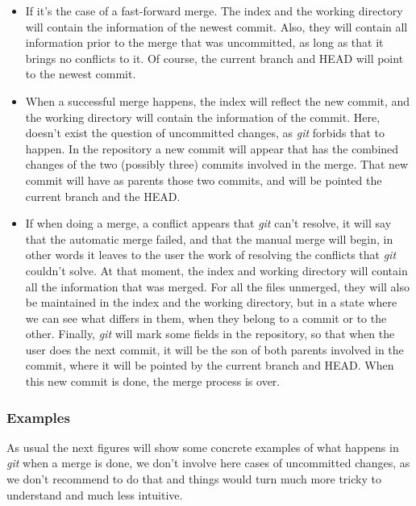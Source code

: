 \begin{itemize}
\item If it's the case of a fast-forward merge. The index and the working directory
will contain the information of the newest commit. Also, they will contain all 
information prior to the merge that was uncommitted, as long as that it brings
no conflicts to it. Of course, the current branch and HEAD will point to the
newest commit.

\item When a successful merge happens, the index will reflect the new commit,
and the working directory will contain the information of the commit. Here,
doesn't exist the question of uncommitted changes, as \emph{git} forbids that
to happen. In the repository a new commit will appear that has the combined
changes of the two (possibly three) commits involved in the merge. That new
commit will have as parents those two commits, and will be pointed the current
branch and the HEAD.

\item If when doing a merge, a conflict appears that \emph{git} can't resolve,
it will say that the automatic merge failed, and that the manual merge will
begin, in other words it leaves to the user the work of resolving the conflicts
that \emph{git} couldn't solve. At that moment, the index and working directory
will contain all the information that was merged. For all the files unmerged, they
will also be maintained in the index and the working directory, but in a
state where we can see what differs in them, when they belong to a commit or to
the other. Finally, \emph{git} will mark some fields in the repository, so that
when the user does the next commit, it will be the son of both parents
involved in the commit, where it will be pointed by the current branch and HEAD.
When this new commit is done, the merge process is over.

\end{itemize}

\subsubsection{Examples}

As usual the next figures will show some concrete examples of what happens
in \emph{git} when a merge is done, we don't involve here cases of 
uncommitted changes, as we don't recommend to do that and 
things would turn much more tricky to understand and much less intuitive. \\

